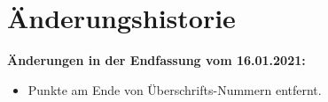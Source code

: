 \section{Änderungshistorie}

\textbf{Änderungen in der Endfassung vom 16.01.2021:}

\begin{itemize}
    \item Punkte am Ende von Überschrifts-Nummern entfernt.
\end{itemize}
